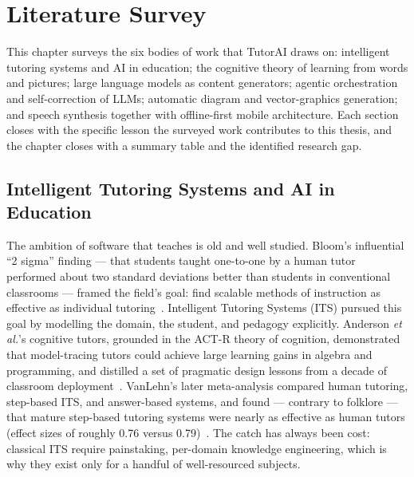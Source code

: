 \chapter{Literature Survey}
\label{ch:literature}

This chapter surveys the six bodies of work that TutorAI draws on:
intelligent tutoring systems and AI in education; the cognitive theory of
learning from words and pictures; large language models as content
generators; agentic orchestration and self-correction of LLMs; automatic
diagram and vector-graphics generation; and speech synthesis together with
offline-first mobile architecture. Each section closes with the specific
lesson the surveyed work contributes to this thesis, and the chapter closes
with a summary table and the identified research gap.

\section{Intelligent Tutoring Systems and AI in Education}

The ambition of software that teaches is old and well studied. Bloom's
influential ``2 sigma'' finding --- that students taught one-to-one by a human
tutor performed about two standard deviations better than students in
conventional classrooms --- framed the field's goal: find scalable methods of
instruction as effective as individual tutoring~\cite{bloom1984}. Intelligent
Tutoring Systems (ITS) pursued this goal by modelling the domain, the student,
and pedagogy explicitly. Anderson \emph{et al.}'s cognitive tutors, grounded
in the ACT-R theory of cognition, demonstrated that model-tracing tutors could
achieve large learning gains in algebra and programming, and distilled a set
of pragmatic design lessons from a decade of classroom
deployment~\cite{anderson1995cognitive}. VanLehn's later meta-analysis
compared human tutoring, step-based ITS, and answer-based systems, and found
--- contrary to folklore --- that mature step-based tutoring systems were
nearly as effective as human tutors (effect sizes of roughly 0.76 versus
0.79)~\cite{vanlehn2011}. The catch has always been cost: classical ITS
require painstaking, per-domain knowledge engineering, which is why they
exist only for a handful of well-resourced subjects.

